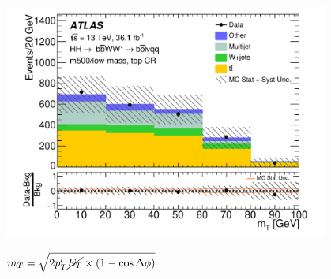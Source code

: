 \documentclass{beamer}
\newcommand*{\met}{\ensuremath{\cancel{E_{T}}}\xspace}
\newcommand*{\header}[1]{\fontsize{16}{8}\selectfont \textbf{{\color{MyPurple}{#1}}}}
\begin{document}
\begin{frame}
\begin{center}
\header{Resolved Background Shape Check}
\end{center}
\begin{center}
\includegraphics[width=0.8\textwidth]{figures/C_mBBcr_reOpt700_mww_bbpt210_wlepmtben_regionA_met25d020-eps-converted-to}
\end{center}
\small
$m_T = \sqrt{2p_T^l\met\times{}(1-\cos{\Delta{\phi}})}$
\end{frame}
\end{document}
